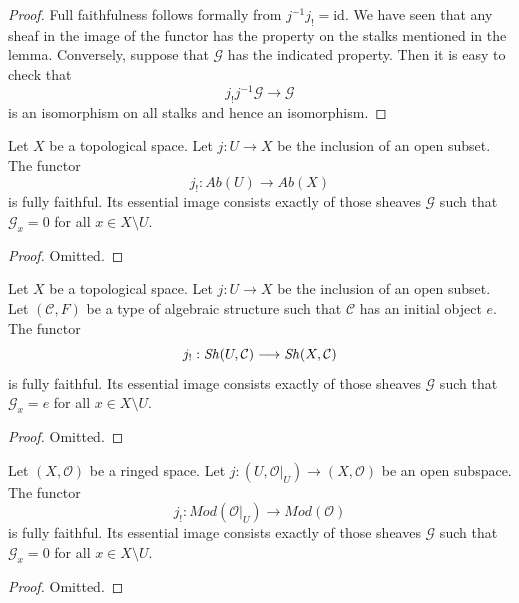 \begin{proof}
Full faithfulness follows formally from $j^{-1} j_! = \text{id}$.
We have seen that any sheaf in the image of the functor has
the property on the stalks mentioned in the lemma. Conversely, suppose
that $\mathcal{G}$ has the indicated property.
Then it is easy to check that
$$
j_! j^{-1} \mathcal{G} \to \mathcal{G}
$$
is an isomorphism on all stalks and hence an isomorphism.
\end{proof}

\begin{lemma}
\label{lemma-equivalence-categories-open-abelian}
Let $X$ be a topological space.
Let $j : U \to X$ be the inclusion of an open subset.
The functor
$$
j_! : \textit{Ab}(U) \longrightarrow \textit{Ab}(X)
$$
is fully faithful. Its essential image consists exactly
of those sheaves $\mathcal{G}$ such that
$\mathcal{G}_x = 0$ for all $x \in X \setminus U$.
\end{lemma}

\begin{proof}
Omitted.
\end{proof}

\begin{lemma}
\label{lemma-equivalence-categories-open-structures}
Let $X$ be a topological space.
Let $j : U \to X$ be the inclusion of an open subset.
Let $(\mathcal{C}, F)$ be a type of algebraic structure
such that $\mathcal{C}$ has an initial object $e$.
The functor
$$
j_! : \mathop{\mathit{Sh}}\nolimits(U, \mathcal{C}) \longrightarrow \mathop{\mathit{Sh}}\nolimits(X, \mathcal{C})
$$
is fully faithful. Its essential image consists exactly
of those sheaves $\mathcal{G}$ such that
$\mathcal{G}_x = e$ for all $x \in X \setminus U$.
\end{lemma}

\begin{proof}
Omitted.
\end{proof}


\begin{lemma}
\label{lemma-equivalence-categories-open-modules}
Let $(X, \mathcal{O})$ be a ringed space.
Let $j : (U, \mathcal{O}|_U) \to (X, \mathcal{O})$
be an open subspace.
The functor
$$
j_! : \textit{Mod}(\mathcal{O}|_U) \longrightarrow \textit{Mod}(\mathcal{O})
$$
is fully faithful. Its essential image consists exactly
of those sheaves $\mathcal{G}$ such that
$\mathcal{G}_x = 0$ for all $x \in X \setminus U$.
\end{lemma}

\begin{proof}
Omitted.
\end{proof}

